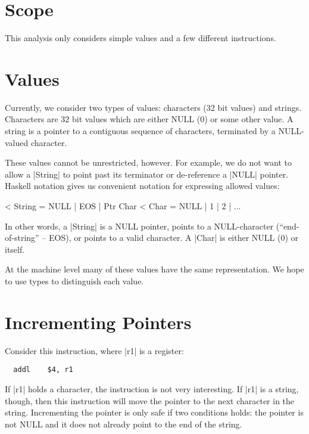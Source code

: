 \documentclass[11pt]{article}
\begin{document}
\doublespacing
{}
\DefineShortVerb{\|}
\VerbatimFootnotes
\DefineShortVerb{\#}

\section*{Scope}

This analysis only considers simple values and a few different instructions. 

\section*{Values}

Currently, we consider two types of values: characters (32 bit values) and strings. Characters are 32 bit values which are either NULL (0) or some other value. A string is a pointer to a contiguous sequence of characters, terminated by a NULL-valued character.

These values cannot be unrestricted, however. For example, we do not
want to allow a |String| to point past its terminator or de-reference a
|NULL| pointer. Haskell notation gives us convenient notation for expressing 
allowed values:

< String = NULL | EOS | Ptr Char
< Char = NULL | 1 | 2 | ... 

In other words, a |String| is a NULL pointer, points to a NULL-character (``end-of-string'' -- EOS), or points to a valid character. A |Char| is either NULL (0) or itself.

At the machine level many of these values have the same representation. We hope to use types to distinguish each value.

\section*{Incrementing Pointers}

Consider this instruction, where |r1| is a register:

\begin{verbatim}
  addl    $4, r1
\end{verbatim}

If |r1| holds a character, the instruction is not very interesting. If
|r1| is a string, though, then this instruction will move the pointer
to the next character in the string. Incrementing the pointer is only
safe if two conditions holds: the pointer is not NULL and it does not
already point to the end of the string.
\end{document}
